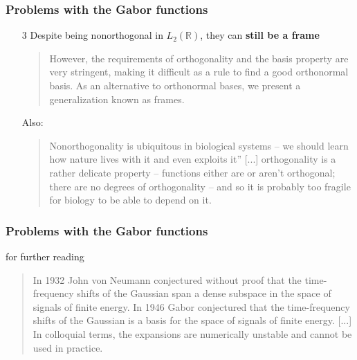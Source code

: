 \documentclass{beamer}
\begin{document}
\begin{frame}
	\frametitle{Problems with the Gabor functions}
	\begin{enumerate}
		\item[3]
			Despite being nonorthogonal in $L_{2}(\mathbb{R})$, they can \textbf{still be a frame}
			\begin{quote}
			However, the requirements of orthogonality and the basis property are very stringent, making it difficult as a rule to find a good orthonormal basis. As an alternative to orthonormal bases, we present a generalization known as frames. 
			\end{quote}
			Also:
			\begin{quote}
				Nonorthogonality is ubiquitous in biological systems -- we should learn how nature lives with it and even exploits it'' [...] orthogonality is a rather delicate property -- functions either are or aren't orthogonal; there are no degrees of orthogonality -- and so it is probably too fragile for biology to be able to depend on it.
			\end{quote}
	\end{enumerate}
\end{frame}

\begin{frame}
	\frametitle{Problems with the Gabor functions}
	\cite{gaborwrong} for further reading
	\begin{quote}
		In 1932 John von Neumann conjectured without proof that the time-frequency shifts of the Gaussian span a dense subspace in the space of signals of finite energy. In 1946 Gabor conjectured that the time-frequency shifts of the Gaussian is a basis for the space of signals of finite energy. [...] In colloquial terms, the expansions are numerically unstable and cannot be used in practice.
	\end{quote}
\end{frame}
\end{document}
